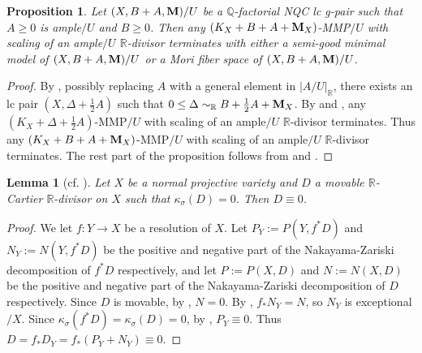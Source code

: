 \documentclass[11pt]{amsart}
\numberwithin{equation}{section}
\newcommand{\Mm}{{\bf{M}}}
\newcommand{\Qq}{\mathbb{Q}}
\newcommand{\Rr}{\mathbb{R}}
\newtheorem{lem}[thm]{Lemma}
\newtheorem{prop}[thm]{Proposition}
\theoremstyle{definition}
\theoremstyle{definition}
\theoremstyle{definition}
\begin{document}
\begin{prop}\label{prop: qfact nqc any scaling terminate}
    Let $(X,B+A,\Mm)/U$ be a $\Qq$-factorial NQC lc g-pair such that $A\geq 0$ is ample$/U$ and $B\geq 0$. Then any $(K_X+B+A+\Mm_X)$-MMP$/U$ with scaling of an ample$/U$ $\Rr$-divisor terminates with either a semi-good minimal model of $(X,B+A,\Mm)/U$ or a Mori fiber space of $(X,B+A,\Mm)/U$.
\end{prop}
\begin{proof}
By \cite[Lemma A.5]{LT22}, possibly replacing $A$ with a general element in $|A/U|_{\mathbb R}$, there exists an lc pair $(X,\Delta+\frac{1}{2}A)$ such that $0\leq \Delta\sim_{\mathbb R}B+\frac{1}{2}A+\Mm_X$. By \cite[Theorem 1.5]{HH20} and \cite[Theorem 1.9]{Bir12}, any $(K_X+\Delta+\frac{1}{2}A)$-MMP$/U$ with scaling of an ample$/U$ $\Rr$-divisor terminates. Thus any $(K_X+B+A+\Mm_X)$-MMP$/U$ with scaling of an ample$/U$ $\Rr$-divisor terminates. The rest part of the proposition follows from \cite[Theorem 1.3]{LX23a} and \cite[Lemma 3.9(1)]{HL21a}.
\end{proof}



\begin{lem}[{cf. \cite[Lemma 2.6(3)]{Gon11}}]\label{lem: movable num 0 is 0}
Let $X$ be a normal projective variety and $D$ a movable $\Rr$-Cartier $\Rr$-divisor on $X$ such that $\kappa_{\sigma}(D)=0$. Then $D\equiv 0$.
\end{lem}
\begin{proof}
We let $f: Y\rightarrow X$ be a resolution of $X$. Let $P_Y:=P(Y,f^*D)$ and $N_Y:=N(Y,f^*D)$ be the positive and negative part of the Nakayama-Zariski decomposition of $f^*D$ respectively, and let $P:=P(X,D)$ and $N:=N(X,D)$ be the positive and negative part of the Nakayama-Zariski decomposition of $D$ respectively. Since $D$ is movable, by \cite[Lemma 3.7(3)]{LX23a}, $N=0$. By \cite[Lemma 3.4(3)]{LX23a}, $f_*N_Y=N$, so $N_Y$ is exceptional$/X$. Since $\kappa_\sigma(f^*D)=\kappa_\sigma(D)=0$, by \cite[V 2.7 Proposition(8)]{Nak04}, $P_Y\equiv 0$. Thus $D=f_*D_Y=f_*(P_Y+N_Y)\equiv 0.$
\end{proof}
\end{document}
